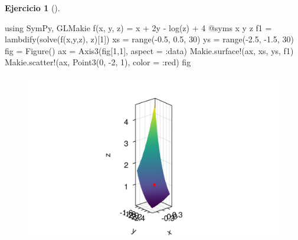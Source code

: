 \documentclass[
  a4paper,
]{scrreport}
\newenvironment{Shaded}{\begin{snugshade}}{\end{snugshade}}
\newcommand{\BuiltInTok}[1]{\textcolor[rgb]{0.00,0.23,0.31}{#1}}
\newcommand{\FloatTok}[1]{\textcolor[rgb]{0.68,0.00,0.00}{#1}}
\newcommand{\FunctionTok}[1]{\textcolor[rgb]{0.28,0.35,0.67}{#1}}
\newcommand{\ImportTok}[1]{\textcolor[rgb]{0.00,0.46,0.62}{#1}}
\newcommand{\NormalTok}[1]{\textcolor[rgb]{0.00,0.23,0.31}{#1}}
\newcommand{\OperatorTok}[1]{\textcolor[rgb]{0.37,0.37,0.37}{#1}}
\newcommand{\PreprocessorTok}[1]{\textcolor[rgb]{0.68,0.00,0.00}{#1}}
\theoremstyle{definition}
\newtheorem{exercise}{Ejercicio}[chapter]
\theoremstyle{remark}
\begin{document}
\begin{exercise}[]
\begin{tcolorbox}
\begin{Shaded}
\begin{Highlighting}[]
\ImportTok{using} \BuiltInTok{SymPy}\NormalTok{, }\BuiltInTok{GLMakie}
\FunctionTok{f}\NormalTok{(x, y, z) }\OperatorTok{=}\NormalTok{ x }\OperatorTok{+} \FloatTok{2}\NormalTok{y }\OperatorTok{{-}} \FunctionTok{log}\NormalTok{(z) }\OperatorTok{+} \FloatTok{4}
\PreprocessorTok{@syms}\NormalTok{ x y z}
\NormalTok{f1 }\OperatorTok{=} \FunctionTok{lambdify}\NormalTok{(}\FunctionTok{solve}\NormalTok{(}\FunctionTok{f}\NormalTok{(x,y,z), z)[}\FloatTok{1}\NormalTok{])}
\NormalTok{xs }\OperatorTok{=} \FunctionTok{range}\NormalTok{(}\OperatorTok{{-}}\FloatTok{0.5}\NormalTok{, }\FloatTok{0.5}\NormalTok{, }\FloatTok{30}\NormalTok{)}
\NormalTok{ys }\OperatorTok{=} \FunctionTok{range}\NormalTok{(}\OperatorTok{{-}}\FloatTok{2.5}\NormalTok{, }\OperatorTok{{-}}\FloatTok{1.5}\NormalTok{, }\FloatTok{30}\NormalTok{)}
\NormalTok{fig }\OperatorTok{=} \FunctionTok{Figure}\NormalTok{()}
\NormalTok{ax }\OperatorTok{=} \FunctionTok{Axis3}\NormalTok{(fig[}\FloatTok{1}\NormalTok{,}\FloatTok{1}\NormalTok{], aspect }\OperatorTok{=} \OperatorTok{:}\NormalTok{data)}
\NormalTok{Makie.}\FunctionTok{surface!}\NormalTok{(ax, xs, ys, f1)}
\NormalTok{Makie.}\FunctionTok{scatter!}\NormalTok{(ax, }\FunctionTok{Point3}\NormalTok{(}\FloatTok{0}\NormalTok{, }\OperatorTok{{-}}\FloatTok{2}\NormalTok{, }\FloatTok{1}\NormalTok{), color }\OperatorTok{=} \OperatorTok{:}\NormalTok{red)}
\NormalTok{fig}
\end{Highlighting}
\end{Shaded}

\begin{figure}[H]

{\centering \includegraphics{09-derivadas-funciones-varias-variables_files/figure-pdf/cell-28-output-1.png}

}
\end{figure}
\end{tcolorbox}
\end{exercise}
\end{document}
